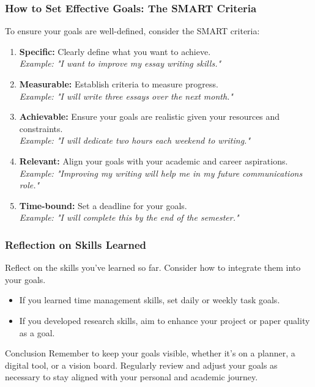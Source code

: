 \documentclass[aspectratio=169]{beamer}
\begin{document}
\begin{frame}[fragile]
    \frametitle{How to Set Effective Goals: The SMART Criteria}
    To ensure your goals are well-defined, consider the SMART criteria:
    \begin{enumerate}
        \item \textbf{Specific:} Clearly define what you want to achieve. \\
              \textit{Example: "I want to improve my essay writing skills."}
        \item \textbf{Measurable:} Establish criteria to measure progress. \\
              \textit{Example: "I will write three essays over the next month."}
        \item \textbf{Achievable:} Ensure your goals are realistic given your resources and constraints. \\
              \textit{Example: "I will dedicate two hours each weekend to writing."}
        \item \textbf{Relevant:} Align your goals with your academic and career aspirations. \\
              \textit{Example: "Improving my writing will help me in my future communications role."}
        \item \textbf{Time-bound:} Set a deadline for your goals. \\
              \textit{Example: "I will complete this by the end of the semester."}
    \end{enumerate}
\end{frame}

\begin{frame}[fragile]
    \frametitle{Reflection on Skills Learned}
    Reflect on the skills you’ve learned so far. Consider how to integrate them into your goals. 
    \begin{itemize}
        \item If you learned time management skills, set daily or weekly task goals.
        \item If you developed research skills, aim to enhance your project or paper quality as a goal.
    \end{itemize}
    
    \begin{block}{Conclusion}
        Remember to keep your goals visible, whether it's on a planner, a digital tool, or a vision board. Regularly review and adjust your goals as necessary to stay aligned with your personal and academic journey.
    \end{block}
\end{frame}
\end{document}
